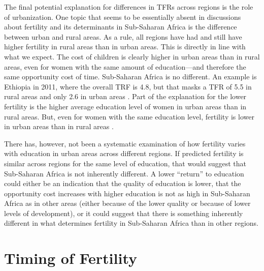 The final potential explanation for differences in TFRs across regions is the role of urbanization. One topic that seems to be essentially absent in discussions about fertility and its determinants in Sub-Saharan Africa is the difference between urban and rural areas. As a rule, all regions have had and still have higher fertility in rural areas than in urban areas. This is directly in line with what we expect. The cost of children is clearly higher in urban areas than in rural areas, even for women with the same amount of education---and therefore the same opportunity cost of time. Sub-Saharan Africa is no different. An example is Ethiopia in 2011, where the overall TRF is 4.8, but that masks a TFR of 5.5 in rural areas and only 2.6 in urban areas \citep{Central-Statistical-Agency/Ethiopia2012}. Part of the explanation for the lower fertility is the higher average education level of women in urban areas than in rural areas. But, even for women with the same education level, fertility is lower in urban areas than in rural areas \citep{Ainsworth1996}.

There has, however, not been a systematic examination of how fertility varies with education in urban areas across different regions. If predicted fertility is similar across regions for the same level of education, that would suggest that Sub-Saharan Africa is not inherently different. A lower ``return'' to education could either be an indication that the quality of education is lower, that the opportunity cost increases with higher education is not as high in Sub-Saharan Africa as in other areas (either because of the lower quality or because of lower levels of development), or it could suggest that there is something inherently different in what determines fertility in Sub-Saharan Africa than in other regions.

\section{Timing of Fertility}\label{timing-of-fertility}

